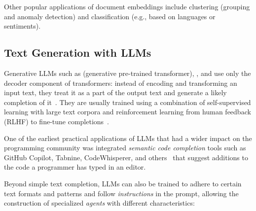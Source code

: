 Other popular applications of document embeddings include clustering (grouping and anomaly detection) and classification (e.g., based on languages or sentiments).

\subsection{Text Generation with LLMs}
\label{sec:background/semtec/generation}

Generative LLMs such as  (generative pre-trained transformer), , and  use only the decoder component of transformers:
instead of encoding and transforming an input text, they treat it as a part of the output text and generate a likely completion of it~\cite{radford2018improving,openai2024gpt4}.
They are usually trained using a combination of self-supervised learning with large text corpora and reinforcement learning from human feedback (RLHF) to fine-tune completions~\cite{ouyang2022training}.

One of the earliest practical applications of LLMs that had a wider impact on the programming community was integrated \emph{semantic code completion} tools such as GitHub Copilot, Tabnine, CodeWhisperer, and others~\cite{chen2021evaluating,barka2023grounded} that suggest additions to the code a programmer has typed in an editor.

Beyond simple text completion, LLMs can also be trained to adhere to certain text formats and patterns and follow \emph{instructions} in the prompt, allowing the construction of specialized \emph{agents} with different characteristics:

